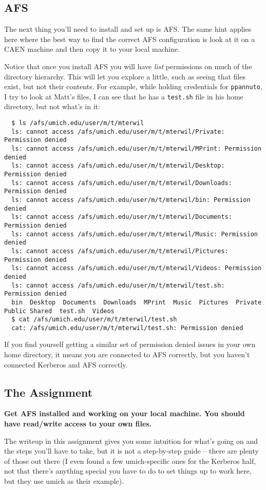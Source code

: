 \documentclass{article}
\begin{document}
\subsection*{AFS}

The next thing you'll need to install and set up is AFS. The same hint applies
here where the best way to find the correct AFS configuration is look at it on
a CAEN machine and then copy it to your local machine.

Notice that once you install AFS you will have \emph{list} permissions on much
of the directory hierarchy. This will let you explore a little, such as seeing
that files exist, but not their contents. For example, while holding
credentials for \texttt{ppannuto}, I try to look at Matt's files, I can see
that he has a \texttt{test.sh} file in his home directory, but not what's in
it:

\begin{lstlisting}
  $ ls /afs/umich.edu/user/m/t/mterwil
  ls: cannot access /afs/umich.edu/user/m/t/mterwil/Private: Permission denied
  ls: cannot access /afs/umich.edu/user/m/t/mterwil/MPrint: Permission denied
  ls: cannot access /afs/umich.edu/user/m/t/mterwil/Desktop: Permission denied
  ls: cannot access /afs/umich.edu/user/m/t/mterwil/Downloads: Permission denied
  ls: cannot access /afs/umich.edu/user/m/t/mterwil/bin: Permission denied
  ls: cannot access /afs/umich.edu/user/m/t/mterwil/Documents: Permission denied
  ls: cannot access /afs/umich.edu/user/m/t/mterwil/Music: Permission denied
  ls: cannot access /afs/umich.edu/user/m/t/mterwil/Pictures: Permission denied
  ls: cannot access /afs/umich.edu/user/m/t/mterwil/Videos: Permission denied
  ls: cannot access /afs/umich.edu/user/m/t/mterwil/test.sh: Permission denied
  bin  Desktop  Documents  Downloads  MPrint  Music  Pictures  Private  Public Shared  test.sh  Videos
  $ cat /afs/umich.edu/user/m/t/mterwil/test.sh
  cat: /afs/umich.edu/user/m/t/mterwil/test.sh: Permission denied
\end{lstlisting}

If you find yourself getting a similar set of permission denied issues in your
own home directory, it means you are connected to AFS correctly, but you
haven't connected Kerberos and AFS correctly.


\subsection*{The Assignment}

\textbf{Get AFS installed and working on your local machine. You should have
read/write access to your own files.}

The writeup in this assignment gives you some intuition for what's going on
and the steps you'll have to take, but it is not a step-by-step guide -- there
are plenty of those out there (I even found a few umich-specific ones for the
Kerberos half, not that there's anything special you have to do to set things
up to work here, but they use umich as their example).
\end{document}
